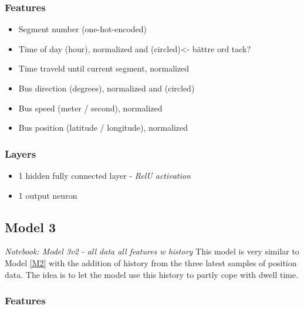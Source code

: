 \subsubsection{Features}

\begin{itemize}
    \item Segment number (one-hot-encoded)
    \item Time of day (hour), normalized and (circled)<- bättre ord tack?
    \item Time traveld until current segment, normalized
    \item Bus direction (degrees), normalized and (circled)
    \item Bus speed (meter / second), normalized
    \item Bus position (latitude / longitude), normalized
\end{itemize}
  

\subsubsection{Layers}

\begin{itemize}
    \item 1 hidden fully connected layer - \textit{RelU activation}
    \item 1 output neuron
\end{itemize}


\subsection{Model 3}
\textit{Notebook: Model 3v2 - all data all features w history}
\noindent This model is very similar to Model \ref{M2} with the addition of history from the three latest samples of position data. The idea is to let the model use this history to partly cope with dwell time.

\subsubsection{Features}

